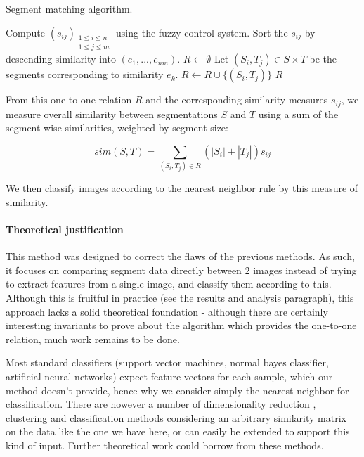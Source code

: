 \begin{algorithm}
\caption{Segment matching algorithm.}
\label{alg:segmentMatching}

\begin{algorithmic}[1]
\State Compute $(s_{ij})_{\substack{1 \leq i \leq n\\ 1 \leq j \leq m}}$ using the fuzzy control system.
\State Sort the $s_{ij}$ by descending similarity into $(e_1, ..., e_{nm})$.
\State $R \gets \emptyset$
\State Let $(S_i,T_j) \in S \times T$ be the segments corresponding to similarity $e_k$.
\State $R \gets R \cup \{(S_i, T_j)\}$
\EndIf
\EndFor
\Return $R$
\EndFunction
\end{algorithmic}
\end{algorithm}

From this one to one relation $R$ and the corresponding similarity measures $s_{ij}$, we measure overall similarity between segmentations $S$ and $T$ using a sum of the segment-wise similarities, weighted by segment size:

\[
sim(S,T) = \sum_{(S_i,T_j) \in R}(|S_i| + |T_j|)s_{ij}
\]

We then classify images according to the nearest neighbor rule by this measure of similarity.

\paragraph{Theoretical justification}
This method was designed to correct the flaws of the previous methods. As such, it focuses on comparing segment data directly between $2$ images instead of trying to extract features from a single image, and classify them according to this. Although this is fruitful in practice (see the results and analysis paragraph), this approach lacks a solid theoretical foundation - although there are certainly interesting invariants to prove about the algorithm which provides the one-to-one relation, much work remains to be done.

Most standard classifiers (support vector machines, normal bayes classifier, artificial neural networks) expect feature vectors for each sample, which our method doesn't provide, hence why we consider simply the nearest neighbor for classification. There are however a number of dimensionality reduction \cite{roweis2000nonlinear} \cite{belkin2003laplacian}, clustering \cite{von2007tutorial} and classification \cite{urahama2007semi} methods considering an arbitrary similarity matrix on the data like the one we have here, or can easily be extended to support this kind of input. Further theoretical work could borrow from these methods.


